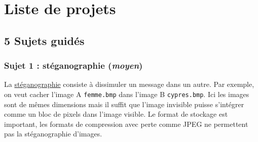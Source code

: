 \documentclass[a4paper, french, 12pt]{article}  %
\begin{document}
\section{Liste de projets}


\subsection{5 Sujets  guidés}

\subsubsection{Sujet 1 : stéganographie (\textit{moyen})}


La \href{https://fr.wikipedia.org/wiki/St\%C3\%A9ganographie}{stéganographie} consiste à dissimuler un message dans un autre. Par exemple, on veut cacher l'image A \texttt{femme.bmp} dans l'image B \texttt{cypres.bmp}. Ici les images sont de mêmes dimensions mais il suffit que l'image invisible puisse s'intégrer comme un bloc de pixels dans l'image visible. Le format de stockage est important, les formats de compression avec perte comme JPEG ne permettent pas la stéganographie d'images. 
\end{document}
